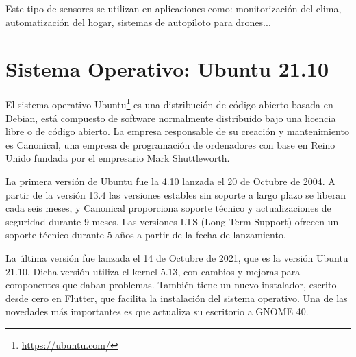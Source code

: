 \documentclass[a4paper, 12pt]{book}
\begin{document}
Este tipo de sensores se utilizan en aplicaciones como: monitorización del clima, automatización del hogar, sistemas de autopiloto para drones...

\section{Sistema Operativo: Ubuntu 21.10} 
\label{sec:sistema_operativo}

El sistema operativo Ubuntu\footnote{\url{https://ubuntu.com/}} es una distribución de código abierto basada en Debian, está compuesto de software normalmente distribuido bajo una licencia libre o de código abierto. La empresa responsable de su creación y mantenimiento es Canonical, una empresa de programación de ordenadores con base en Reino Unido fundada por el empresario Mark Shuttleworth.

La primera versión de Ubuntu fue la 4.10 lanzada el 20 de Octubre de 2004. A partir de la versión 13.4 las versiones estables sin soporte a largo plazo se liberan cada seis meses, y Canonical proporciona soporte técnico y actualizaciones de seguridad durante 9 meses. Las versiones LTS (Long Term Support) ofrecen un soporte técnico durante 5 años a partir de la fecha de lanzamiento.

La última versión fue lanzada el 14 de Octubre de 2021, que es la versión Ubuntu 21.10. Dicha versión utiliza el kernel 5.13, con cambios y mejoras para componentes que daban problemas. También tiene un nuevo instalador, escrito desde cero en Flutter, que facilita la instalación del sistema operativo. Una de las novedades más importantes es que actualiza su escritorio a GNOME 40. 
\end{document}
